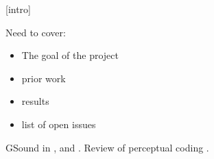 [intro]

Need to cover:
\begin{itemize}
\item The goal of the project
\item prior work
\item results 
\item list of open issues 
\end{itemize}

GSound in \cite{schissler2011gsound}, and \cite{schissler2014high}. Review of perceptual coding \cite{painter2000perceptual}. 

